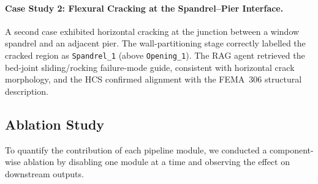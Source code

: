 \paragraph{Case Study 2: Flexural Cracking at the Spandrel--Pier Interface.}
\begin{sloppypar}
A second case exhibited horizontal cracking at the junction between a window
spandrel and an adjacent pier.
The wall-partitioning stage correctly labelled the cracked region as
\texttt{Spandrel\_1} (above \texttt{Opening\_1}).
The RAG agent retrieved the bed-joint sliding/rocking failure-mode guide,
consistent with horizontal crack morphology, and the HCS confirmed alignment
with the FEMA~306 structural description.
\end{sloppypar}

\subsection{Ablation Study}
\label{subsec:ablation}

\begin{sloppypar}
To quantify the contribution of each pipeline module, we conducted a component-wise
ablation by disabling one module at a time and observing the effect on downstream
outputs.
\end{sloppypar}

